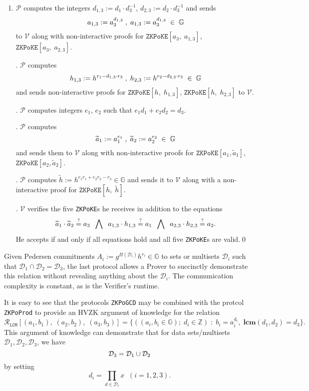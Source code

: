 \documentclass[11pt, lettersize, notitlepage, leqno, footskip=0.6cm]{article}
\newcommand{\bz}{\mathbb Z}
\newcommand{\ttt}{\texttt}
\newcommand{\bG}{\mathbb{G}}
\newcommand{\wti}{\widetilde}
\newcommand{\mc}{\mathcal}
\newcommand{\mb}{\mathbb}
\newcommand{\mbf}{\mathbf}
\newcommand{\mP}{\mc{P}}
\newcommand{\V}{\mc{V}}
\newcommand{\vs}{\vspace{-0.15cm}}
\newcommand{\noin}{\noindent}
\newcommand{\sta}{\stackrel{?}{=}}
\newcommand{\LCM}{\mbf{lcm}}
\numberwithin{equation}{section}
\begin{document}
\begin{enumerate}[wide, labelwidth=!, labelindent=0pt]\vs \item $\mP$ computes the integers $d_{1,3}:= d_1\cdot d_3^{-1}$, $d_{2,3}:= d_2\cdot d_3^{-1}$ and sends \vs $$a_{1,3}:= a_3^{d_{1,3}}\;,\;a_{1,3}:= a_3^{d_{1,3}}\;\in\;\bG \vs $$ to $\V$ along with non-interactive proofs for $\ttt{ZKPoKE}[a_3,\;a_{1,3}]$, $\ttt{ZKPoKE}[a_3,\;a_{2,3}]$.

\noin 2. $\mP$ computes \vs $$h_{1,3}:= h^{r_1 - d_{1,3}\cdot r_3}\;,\; h_{2,3}:= h^{r_2 - d_{2,3}\cdot r_3}\;\in\;\bG\vs $$ and sends non-interactive proofs for $\ttt{ZKPoKE}[h,\;h_{1,3}]$, $\ttt{ZKPoKE}[h,\;h_{2,3}]$ to $\V$.

\noin 3. $\mP$ computes integers $e_1$, $e_2$ such that $e_1d_1+e_2d_2 = d_3$. 

\noin 4. $\mP$ computes \vs $$ \wti{a}_1:= a_1^{e_1}\;,\;  \wti{a}_2:= a_2^{e_2}\;\in\;\bG \vs $$ and sends them to $\V$ along with non-interactive proofs for $\ttt{ZKPoKE}[a_1,\wti{a}_1]$, $\ttt{ZKPoKE}[a_2,\wti{a}_2]$.

\noin 5. $\mP$ computes $\wti{h}:= h^{e_1r_1+e_2r_2-r_3}\in \bG$ and sends it to $\V$ along with a non-interactive proof for $\ttt{ZKPoKE}[h,\;\wti{h}]$.

\noin 6. $\V$ verifies the five \verb|ZKPoKE|s he receives in addition to the equations \vs $$ \wti{a}_1\cdot \wti{a}_2\sta a_3 \;\;\bigwedge\;\;a_{1,3}\cdot h_{1,3}\sta a_1 \;\;\bigwedge\;\;a_{2,3}\cdot h_{2,3}\sta a_2 . \vs $$ He accepts if and only if all equations hold and all five \verb|ZKPoKE|s are valid.\qed \end{enumerate}

Given Pedersen commitments $A_i:= g^{\Pi(\mc{D}_i)}h^{r_i}\in \bG $ to sets or multisets $\mc{D}_i$ such that $\mc{D}_1\cap \mc{D}_2 = \mc{D}_3$, the last protocol allows a Prover to succinctly demonstrate this relation    without revealing anything about the $\mc{D}_i$. The communication complexity is constant, as is the Verifier's runtime.


\bigskip




It is easy to see that the protocols \verb|ZKPoGCD| may be combined with the protcol \verb|ZKPoProd| to provide an HVZK argument of knowledge for the relation \vs \[ \mc{R}_{{\ttt{LCM}}}[(a_1,b_1),\;(a_2,b_2), \; (a_3, b_3)] = \{((a_i, b_i\in\mb{G});\;d_i\in\bz)\;:\; b_i = a_i^{d_i},\;\LCM(d_1,d_2)=d_3 \} .\] This argument of knowledge can demonstrate that for data sets/multisets $\mc{D}_1,\mc{D}_2, \mc{D}_3$, we have \vs $$\mc{D}_3 = \mc{D}_1\cup \mc{D}_2 \vs $$ by setting \vs $$ d_i = \prod\limits_{d\in\mc{D}_i} x\;\;(i=1,2,3). $$
\end{document}
